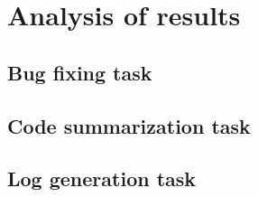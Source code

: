 \chapter{Analysis of results}

\section{Bug fixing task}
\section{Code summarization task}
\section{Log generation task}